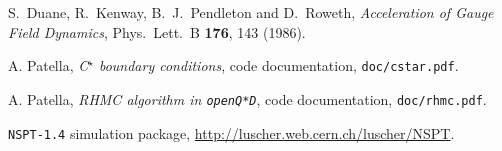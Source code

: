 \documentclass[11pt,fleqn]{article}
\begin{document}
\begin{thebibliography}{9}

  S.~Duane, R.~Kenway, B.~J.~Pendleton and D.~Roweth,
  \textit{Acceleration of Gauge Field Dynamics},
  Phys.\ Lett.\ B {\bf 176}, 143 (1986).
  
  A. Patella,
  \textit{C$^\star$ boundary conditions}, code documentation,
  \texttt{doc/cstar.pdf}.

  A. Patella,
  \textit{RHMC algorithm in \texttt{openQ*D}}, code documentation,
  \texttt{doc/rhmc.pdf}.

  \texttt{NSPT-1.4} simulation package,
  \url{http://luscher.web.cern.ch/luscher/NSPT}.

\end{thebibliography}
\end{document}
